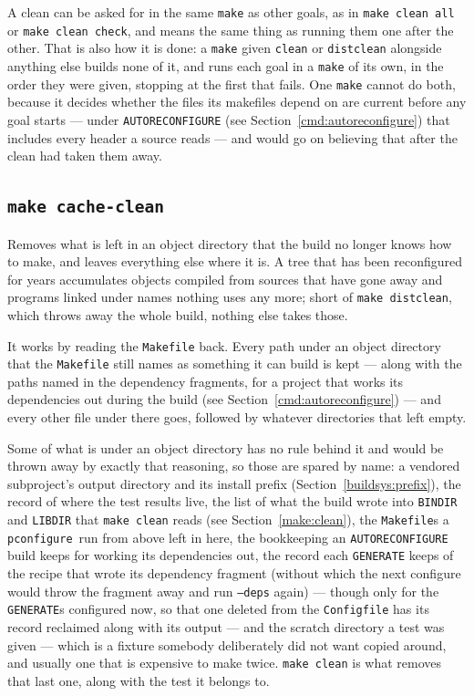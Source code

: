 \documentclass{article}
\newcommand{\pconfigure}{\texttt{pconfigure}}
\begin{document}
A clean can be asked for in the same \texttt{make} as other goals, as
in \texttt{make clean all} or \texttt{make clean check}, and means the
same thing as running them one after the other.  That is also how it
is done: a \texttt{make} given \texttt{clean} or \texttt{distclean}
alongside anything else builds none of it, and runs each goal in a
\texttt{make} of its own, in the order they were given, stopping at
the first that fails.  One \texttt{make} cannot do both, because it
decides whether the files its makefiles depend on are current before
any goal starts --- under \texttt{AUTORECONFIGURE} (see
Section~\ref{cmd:autoreconfigure}) that includes every header a
source reads --- and would go on believing that after the clean had
taken them away.

\subsection{\texttt{make cache-clean} \label{make:cache_clean}}

Removes what is left in an object directory that the build no longer
knows how to make, and leaves everything else where it is.  A tree
that has been reconfigured for years accumulates objects compiled from
sources that have gone away and programs linked under names nothing
uses any more; short of \texttt{make distclean}, which throws away the
whole build, nothing else takes those.

It works by reading the \texttt{Makefile} back.  Every path under an
object directory that the \texttt{Makefile} still names as something
it can build is kept --- along with the paths named in the dependency
fragments, for a project that works its dependencies out during the
build (see Section~\ref{cmd:autoreconfigure}) --- and every other file
under there goes, followed by whatever directories that left empty.

Some of what is under an object directory has no rule behind it and
would be thrown away by exactly that reasoning, so those are spared by
name: a vendored subproject's output directory and its install prefix
(Section~\ref{buildsys:prefix}), the record of where the test results
live, the list of what the build wrote into \texttt{BINDIR} and
\texttt{LIBDIR} that \texttt{make clean} reads (see
Section~\ref{make:clean}), the \texttt{Makefile}s a \pconfigure\
run from above left in here, the bookkeeping an \texttt{AUTORECONFIGURE} build keeps for
working its dependencies out, the record each \texttt{GENERATE} keeps
of the recipe that wrote its dependency fragment (without which the
next configure would throw the fragment away and run \texttt{--deps}
again) --- though only for the \texttt{GENERATE}s configured now, so
that one deleted from the \texttt{Configfile} has its record reclaimed
along with its output --- and the scratch directory a test was
given --- which is a fixture somebody deliberately did not want copied
around, and usually one that is expensive to make twice.
\texttt{make clean} is what removes that last one, along with the
test it belongs to.
\end{document}

